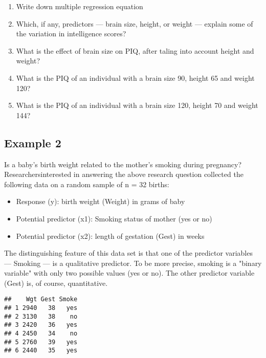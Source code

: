 \documentclass[12pt]{article}\usepackage[]{graphicx}\usepackage[]{color}
\makeatletter
\newenvironment{kframe}{%
 \def\at@end@of@kframe{}%
 \ifinner\ifhmode%
  \def\at@end@of@kframe{\end{minipage}}%
  \begin{minipage}{\columnwidth}%
 \fi\fi%
 \def\FrameCommand##1{\hskip\@totalleftmargin \hskip-\fboxsep
 \colorbox{shadecolor}{##1}\hskip-\fboxsep
     \hskip-\linewidth \hskip-\@totalleftmargin \hskip\columnwidth}%
 \MakeFramed {\advance\hsize-\width
   \@totalleftmargin\z@ \linewidth\hsize
   \@setminipage}}%
 {\par\unskip\endMakeFramed%
 \at@end@of@kframe}
\newenvironment{knitrout}{}{} %
\makeatother
\begin{document}
\begin{enumerate}
  \item Write down multiple regression equation
  \item Which, if any, predictors — brain size, height, or weight — explain some of the variation in intelligence scores?
  \item What is the effect of brain size on PIQ, after taling into account height and weight?
  \item What is the PIQ of an individual with a brain size 90, height 65 and weight 120?
  \item What is the PIQ of an individual with a brain size 120, height 70 and weight 144?
\end{enumerate}

\subsection{Example 2}
Is a baby's birth weight related to the mother's smoking during pregnancy? Researchersinterested in answering the above research question collected the following data on a random sample of n = 32 births:
\begin{itemize}
  \item Response (y): birth weight (Weight) in grams of baby
  \item Potential predictor (x1): Smoking status of mother (yes or no)
  \item Potential predictor (x2): length of gestation (Gest) in weeks
\end{itemize}
The distinguishing feature of this data set is that one of the predictor variables — Smoking — is a qualitative predictor. To be more precise, smoking is a "binary variable" with only two possible values (yes or no). The other predictor variable (Gest) is, of course, quantitative.

\begin{knitrout}
\color{fgcolor}\begin{kframe}
\begin{verbatim}
##    Wgt Gest Smoke
## 1 2940   38   yes
## 2 3130   38    no
## 3 2420   36   yes
## 4 2450   34    no
## 5 2760   39   yes
## 6 2440   35   yes
\end{verbatim}
\end{kframe}
\end{knitrout}
\end{document}
